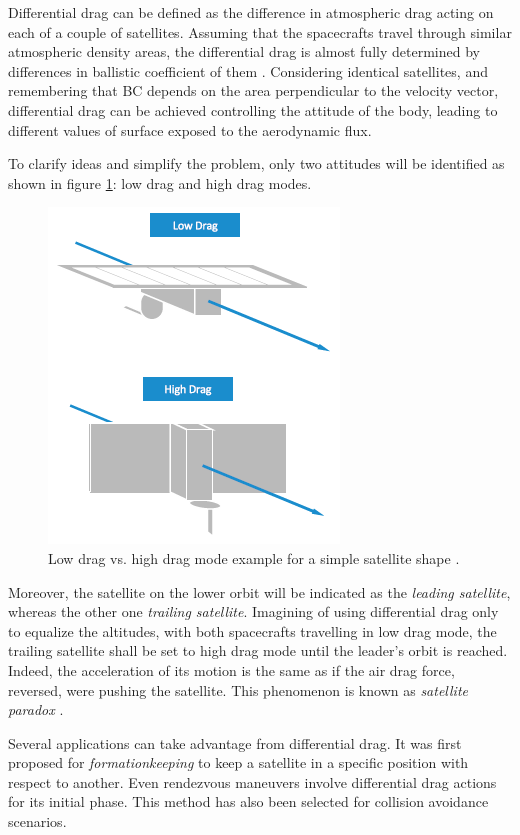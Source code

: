 Differential drag can be defined as the difference in atmospheric drag acting on each of a couple of satellites.
Assuming that the spacecrafts travel through similar atmospheric density areas, the differential drag is almost fully determined by differences in ballistic coefficient of them \cite{leonard1991formationkeeping}.
Considering identical satellites, and remembering that BC depends on the area perpendicular to the velocity vector, differential drag can be achieved controlling the attitude of the body, leading to different values of surface exposed to the aerodynamic flux. 

To clarify ideas and simplify the problem, only two attitudes will be identified as shown in figure \ref{low_vs_high_dragmode_fig}: low drag and high drag modes.
\begin{figure}[h]
    \centering
    \includegraphics[scale=1]{img/low_vs_high_dragmode.png}
    \caption{Low drag vs. high drag mode example for a simple satellite shape \cite{foster2018differential}.}
    \label{low_vs_high_dragmode_fig}
\end{figure}
Moreover, the satellite on the lower orbit will be indicated as the \textit{leading satellite}, whereas the other one \textit{trailing satellite}.
Imagining of using differential drag only to equalize the altitudes, with both spacecrafts travelling in low drag mode, the trailing satellite shall be set to high drag mode until the leader's orbit is reached.
Indeed, the acceleration of its motion is the same as if the air drag force, reversed, were pushing the satellite. 
This phenomenon is known as \textit{satellite paradox} \cite{mills1959satellite}. 

Several applications can take advantage from differential drag. It was first proposed for \textit{formationkeeping} to keep a satellite in a specific position with respect to another.
Even rendezvous maneuvers involve differential drag actions for its initial phase.
This method has also been selected for collision avoidance scenarios.

